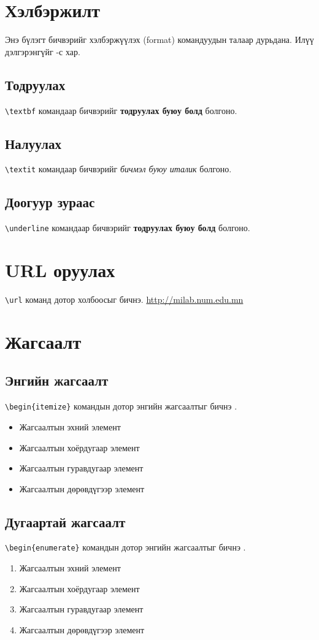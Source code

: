 \section{Хэлбэржилт}
Энэ бүлэгт бичвэрийг хэлбэржүүлэх (format) командуудын талаар дурьдана. Илүү дэлгэрэнгүйг \cite{format1}-с хар.

\subsection{Тодруулах}
\texttt{\textbackslash textbf} командаар бичвэрийг \textbf{тодруулах буюу болд} болгоно.

\subsection{Налуулах}
\texttt{\textbackslash textit} командаар бичвэрийг \textit{бичмэл буюу италик} болгоно.

\subsection{Доогуур зураас}
\texttt{\textbackslash underline} командаар бичвэрийг \textbf{тодруулах буюу болд} болгоно.

\section{URL оруулах}
\texttt{\textbackslash url} команд дотор холбоосыг бичнэ. \url{http://milab.num.edu.mn}


\section{Жагсаалт}
\subsection{Энгийн жагсаалт}
\texttt{\textbackslash begin\{itemize\}} командын дотор энгийн жагсаалтыг бичнэ \cite{list}.
\begin{itemize}
	\item Жагсаалтын эхний элемент
	\item Жагсаалтын хоёрдугаар элемент
	\item Жагсаалтын гуравдугаар элемент
	\item Жагсаалтын дөрөвдүгээр элемент
\end{itemize}

\subsection{Дугаартай жагсаалт}
\texttt{\textbackslash begin\{enumerate\}} командын дотор энгийн жагсаалтыг бичнэ \cite{list}.
\begin{enumerate}
	\item Жагсаалтын эхний элемент
	\item Жагсаалтын хоёрдугаар элемент
	\item Жагсаалтын гуравдугаар элемент
	\item Жагсаалтын дөрөвдүгээр элемент
\end{enumerate}


